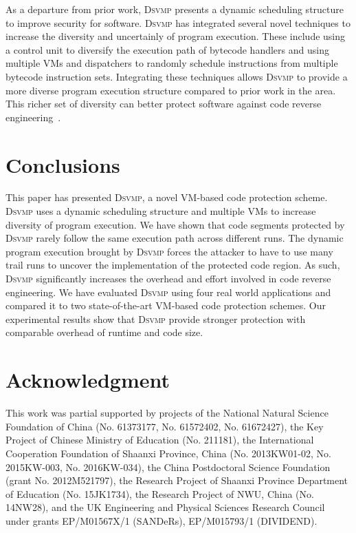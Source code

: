 \documentclass[preprint,12pt,3p]{elsarticle}
\newcommand{\DSVMP}{\textsc{Dsvmp}\xspace}
\begin{document}
As a departure from prior work, \DSVMP presents a dynamic scheduling structure to improve security for software.
\DSVMP has integrated several novel techniques to increase the diversity and uncertainly of program execution.
These include using a control unit to diversify the execution path of bytecode handlers and using multiple VMs
and dispatchers to randomly schedule instructions from multiple bytecode instruction sets.
Integrating these techniques allows \DSVMP to provide a more diverse program execution structure compared to prior work in the area.
This richer set of diversity can better protect software against code reverse engineering~\cite{20larsen2014sok}.


\section{Conclusions}\label{sec:con}
This paper has presented \DSVMP, a novel VM-based code protection scheme.
\DSVMP uses a dynamic scheduling structure and multiple VMs to increase
diversity of program execution. We have shown that code
segments protected by \DSVMP rarely follow the same execution path across
different runs. The dynamic program execution brought by \DSVMP forces the attacker
to have to use many trail runs to uncover the implementation of the protected code
region. As such, \DSVMP significantly increases the overhead and effort
involved in code reverse engineering. We have evaluated \DSVMP using four
real world applications and compared it to two state-of-the-art VM-based code
protection schemes. Our experimental results show that \DSVMP provide
stronger protection with comparable overhead of runtime and code size.

\section*{Acknowledgment}
This work was partial supported by projects of the National Natural Science Foundation of China
(No. 61373177, No. 61572402, No. 61672427),
the Key Project of Chinese Ministry of Education (No. 211181),
the International Cooperation Foundation of Shaanxi Province, China (No. 2013KW01-02, No. 2015KW-003, No. 2016KW-034),
the China Postdoctoral Science Foundation (grant No. 2012M521797),
the Research Project of Shaanxi Province Department of Education (No. 15JK1734),
the Research Project of NWU, China (No. 14NW28),
and the UK Engineering and Physical Sciences Research Council under grants EP/M01567X/1 (SANDeRs), EP/M015793/1 (DIVIDEND).
\end{document}
